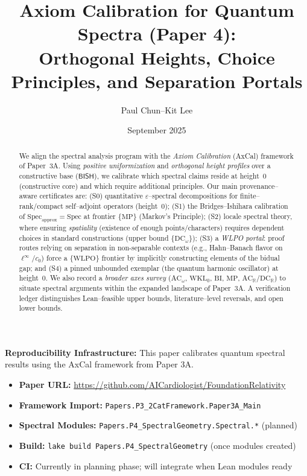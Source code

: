 \documentclass[11pt]{article}
\title{Axiom Calibration for Quantum Spectra (Paper 4):\\
Orthogonal Heights, Choice Principles, and Separation Portals}
\author{Paul Chun--Kit Lee}
\date{September 2025}
\theoremstyle{plain}
\theoremstyle{definition}
\theoremstyle{remark}
\newcommand{\ReproBox}[1]{\begin{mdframed}[linewidth=1pt,linecolor=blue,backgroundcolor=blue!5] #1 \end{mdframed}}
\newcommand{\LeanTarget}[1]{\texttt{#1}}
\newcommand{\linf}{\ell^\infty}
\newcommand{\BISH}{\mathsf{BISH}}
\newcommand{\WLPO}{\mathrm{WLPO}}
\newcommand{\DCw}{\mathrm{DC}_\omega}
\newcommand{\ACw}{\mathrm{AC}_\omega}
\newcommand{\ACR}{\mathrm{AC}_{\mathbb{R}}}
\newcommand{\DCR}{\mathrm{DC}_{\mathbb{R}}}
\newcommand{\WKLz}{\mathrm{WKL}_0}
\newcommand{\BI}{\mathrm{BI}}
\newcommand{\MP}{\mathrm{MP}}
\begin{document}
\maketitle

\begin{abstract}
We align the spectral analysis program with the \emph{Axiom Calibration} (AxCal) framework of Paper~3A.
Using \emph{positive uniformization} and \emph{orthogonal height profiles} over a constructive base ($\BISH$), we calibrate which spectral claims reside at height~0 (constructive core) and which require additional principles.
Our main provenance--aware certificates are:
(S0) quantitative $\varepsilon$--spectral decompositions for finite--rank/compact self--adjoint operators (height~0);
(S1) the Bridges--Ishihara calibration of $\mathrm{Spec}_{\mathrm{approx}}=\mathrm{Spec}$ at frontier $\{\MP\}$ (Markov's Principle);
(S2) locale spectral theory, where ensuring \emph{spatiality} (existence of enough points/characters) requires dependent choices in standard constructions (upper bound $\{\DCw\}$);
(S3) a \emph{WLPO portal}: proof routes relying on separation in non-separable contexts (e.g., Hahn--Banach flavor on $\linf/c_0$) force a $\{\WLPO\}$ frontier by implicitly constructing elements of the bidual gap;
and (S4) a pinned unbounded exemplar (the quantum harmonic oscillator) at height~0.
We also record a \emph{broader axes survey} ($\ACw$, $\WKLz$, $\BI$, $\MP$, $\ACR/\DCR$) to situate spectral arguments within the expanded landscape of Paper~3A.
A verification ledger distinguishes Lean--feasible upper bounds, literature--level reversals, and open lower bounds.
\end{abstract}

\tableofcontents

\ReproBox{
\textbf{Reproducibility Infrastructure:} This paper calibrates quantum spectral results using the AxCal framework from Paper 3A.
\begin{itemize}[leftmargin=*]
  \item \textbf{Paper URL:} \url{https://github.com/AICardiologist/FoundationRelativity}
  \item \textbf{Framework Import:} \LeanTarget{Papers.P3\_2CatFramework.Paper3A\_Main}
  \item \textbf{Spectral Modules:} \LeanTarget{Papers.P4\_SpectralGeometry.Spectral.*} (planned)
  \item \textbf{Build:} \texttt{lake build Papers.P4\_SpectralGeometry} (once modules created)
  \item \textbf{CI:} Currently in planning phase; will integrate when Lean modules ready
\end{itemize}
}
\end{document}
